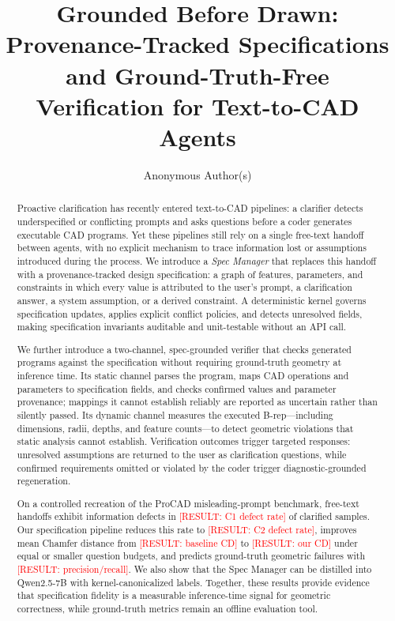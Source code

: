 \documentclass[acmtog,review,anonymous]{acmart}
\author{Anonymous Author(s)}
\affiliation{\institution{Anonymous Institution}\city{}\country{}}
\newcommand{\RESULT}[1]{\textcolor{red}{[RESULT: #1]}}
\begin{document}
\title{Grounded Before Drawn: Provenance-Tracked Specifications and
  Ground-Truth-Free Verification for Text-to-CAD Agents}

\begin{abstract}
Proactive clarification has recently entered text-to-CAD pipelines: a
clarifier detects underspecified or conflicting prompts and asks questions
before a coder generates executable CAD programs. Yet these pipelines still
rely on a single free-text handoff between agents, with no explicit
mechanism to trace information lost or assumptions introduced during the
process. We introduce a \emph{Spec Manager} that replaces this handoff with
a provenance-tracked design specification: a graph of features, parameters,
and constraints in which every value is attributed to the user's prompt, a
clarification answer, a system assumption, or a derived constraint. A
deterministic kernel governs specification updates, applies explicit
conflict policies, and detects unresolved fields, making specification
invariants auditable and unit-testable without an API call.

We further introduce a two-channel, spec-grounded verifier that checks
generated programs against the specification without requiring
ground-truth geometry at inference time. Its static channel parses the
program, maps CAD operations and parameters to specification fields, and
checks confirmed values and parameter provenance; mappings it cannot
establish reliably are reported as uncertain rather than silently passed.
Its dynamic channel measures the executed B-rep---including dimensions,
radii, depths, and feature counts---to detect geometric violations that
static analysis cannot establish. Verification outcomes trigger targeted
responses: unresolved assumptions are returned to the user as clarification
questions, while confirmed requirements omitted or violated by the coder
trigger diagnostic-grounded regeneration.

On a controlled recreation of the ProCAD misleading-prompt benchmark,
free-text handoffs exhibit information defects in \RESULT{C1 defect rate}
of clarified samples. Our specification pipeline reduces this rate to
\RESULT{C2 defect rate}, improves mean Chamfer distance from
\RESULT{baseline CD} to \RESULT{our CD} under equal or smaller question
budgets, and predicts ground-truth geometric failures with
\RESULT{precision/recall}. We also show that the Spec Manager can be
distilled into Qwen2.5-7B with kernel-canonicalized labels. Together,
these results provide evidence that specification fidelity is a measurable
inference-time signal for geometric correctness, while ground-truth metrics
remain an offline evaluation tool.
\end{abstract}
\end{document}
